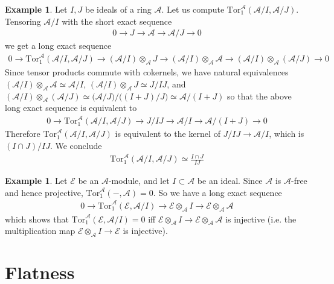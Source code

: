 \documentclass[12pt,b5paper,notitlepage]{report}
\theoremstyle{definition}
\newtheorem{eg}[df]{Example}
\theoremstyle{plain}
\newcommand{\mc}{\mathcal}
\newcommand{\Tor}{\mathrm{Tor}}
\numberwithin{equation}{section}
\begin{document}
\begin{eg}\label{lb262}
Let $I,J$ be ideals of a ring $\mc A$. Let us compute $\Tor_1^{\mc A}(\mc A/I,\mc A/J)$. Tensoring $\mc A/I$ with the short exact sequence
\begin{align*}
0\rightarrow J\rightarrow\mc A\rightarrow\mc A/J\rightarrow0
\end{align*}
we get a long exact sequence
\begin{align*}
0\rightarrow\Tor_1^{\mc A}(\mc A/I,\mc A/J)\rightarrow(\mc A/I)\otimes_{\mc A}J\rightarrow(\mc A/I)\otimes_{\mc A}\mc A\rightarrow(\mc A/I)\otimes_{\mc A}(\mc A/J)\rightarrow0
\end{align*}
Since tensor products commute with cokernels, we have natural equivalences $(\mc A/I)\otimes_{\mc A}\mc A\simeq\mc A/I$, $(\mc A/I)\otimes_{\mc A}J\simeq J/I J$, and $(\mc A/I)\otimes_{\mc A}(\mc A/J)\simeq \big(\mc A/J\big)\big/\big((I+J)/J\big)\simeq\mc A/(I+J)$ so that the above long exact sequence is equivalent to
\begin{align*}
0\rightarrow\Tor_1^{\mc A}(\mc A/I,\mc A/J)\rightarrow J/IJ\rightarrow \mc A/I\rightarrow \mc A/(I+J)\rightarrow0
\end{align*}
Therefore $\Tor_1^{\mc A}(\mc A/I,\mc A/J)$ is equivalent to the kernel of $J/IJ\rightarrow\mc A/I$, which is $(I\cap J)/IJ$. We conclude
\begin{align}
\Tor_1^{\mc A}(\mc A/I,\mc A/J)\simeq \frac{I\cap J}{IJ}
\end{align}
\end{eg}

\begin{eg}\label{lb265}
Let $\mc E$ be an $\mc A$-module, and let $I\subset\mc A$ be an ideal. Since $\mc A$ is $\mc A$-free and hence projective, $\Tor_1^{\mc A}(-,\mc A)=0$. So we have a long exact sequence
\begin{align}
0\rightarrow \Tor_1^{\mc A}(\mc E,\mc A/I)\rightarrow\mc E\otimes_{\mc A}I\rightarrow\mc E\otimes_{\mc A}\mc A
\end{align}
which shows that $\Tor_1^{\mc A}(\mc E,\mc A/I)=0$ iff $\mc E\otimes_{\mc A}I\rightarrow\mc E\otimes_{\mc A}\mc A$ is injective (i.e. the multiplication map $\mc E\otimes_{\mc A}I\rightarrow\mc E$ is injective).
\end{eg}








\section{Flatness}
\end{document}
